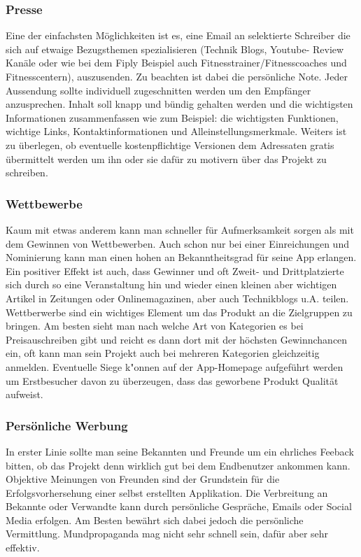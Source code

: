 \documentclass[FIPLY_base.tex]{subfiles}
\begin{document}
\subsubsection{Presse}
Eine der einfachsten Möglichkeiten ist es, eine Email an selektierte Schreiber die sich auf etwaige Bezugsthemen spezialisieren (Technik Blogs, Youtube- Review Kanäle oder wie bei dem Fiply Beispiel auch Fitnesstrainer/Fitnesscoaches und Fitnesscentern), auszusenden. Zu beachten ist dabei die persönliche Note. Jeder Aussendung sollte individuell zugeschnitten werden um den Empfänger anzusprechen. Inhalt soll knapp und bündig gehalten werden und die wichtigsten Informationen zusammenfassen wie zum Beispiel: die wichtigsten Funktionen, wichtige Links, Kontaktinformationen und Alleinstellungsmerkmale. Weiters ist zu überlegen, ob eventuelle kostenpflichtige Versionen dem Adressaten gratis übermittelt werden um ihn oder sie dafür zu motivern über das Projekt zu schreiben. 

\subsubsection{Wettbewerbe}
Kaum mit etwas anderem kann man schneller für Aufmerksamkeit sorgen als mit dem Gewinnen von Wettbewerben. Auch schon nur bei einer Einreichungen und Nominierung kann man einen hohen an Bekanntheitsgrad für seine App erlangen. Ein positiver Effekt ist auch, dass Gewinner und oft Zweit- und Drittplatzierte sich durch so eine Veranstaltung hin und wieder einen kleinen aber wichtigen Artikel in Zeitungen oder Onlinemagazinen, aber auch Technikblogs u.A. teilen. Wettberwerbe sind ein wichtiges Element um das Produkt an die Zielgruppen zu bringen. Am besten sieht man nach welche Art von Kategorien es bei Preisauschreiben gibt und reicht es dann dort mit der höchsten Gewinnchancen ein, oft kann man sein Projekt auch bei mehreren Kategorien gleichzeitig anmelden. 
\newline
Eventuelle Siege k"onnen auf der App-Homepage aufgeführt werden um Erstbesucher davon zu überzeugen, dass das geworbene Produkt Qualität aufweist.

\subsubsection{Persönliche Werbung}
In erster Linie sollte man seine Bekannten und Freunde um ein ehrliches Feeback bitten, ob das Projekt denn wirklich gut bei dem Endbenutzer ankommen kann. Objektive Meinungen von Freunden sind der Grundstein für die Erfolgsvorhersehung einer selbst erstellten Applikation. Die Verbreitung an Bekannte oder Verwandte kann durch persönliche Gespräche, Emails oder Social Media erfolgen. Am Besten bewährt sich dabei jedoch die persönliche Vermittlung. Mundpropaganda mag nicht sehr schnell sein, dafür aber sehr effektiv.
\end{document}
